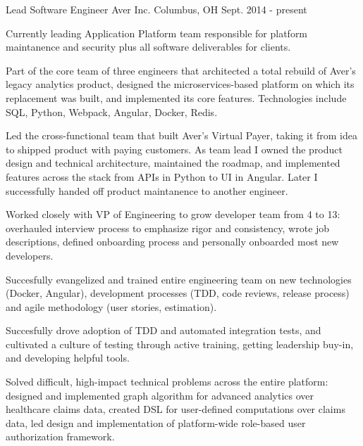 

\begin{cventries}

  \cventry
    {Lead Software Engineer} %
    {Aver Inc.} %
    {Columbus, OH} %
    {Sept. 2014 - present} %
    {
      \begin{cvitems} %
        \item {Currently leading Application Platform team responsible for platform maintanence and security plus all software deliverables for clients.}
        \item {Part of the core team of three engineers that architected a total rebuild of Aver's legacy analytics product, designed the microservices-based platform on which its replacement was built, and implemented its core features. Technologies include SQL, Python, Webpack, Angular, Docker, Redis.}
        \item {Led the cross-functional team that built Aver's Virtual Payer, taking it from idea to shipped product with paying customers. As team lead I owned the product design and technical architecture, maintained the roadmap, and implemented features across the stack from APIs in Python to UI in Angular. Later I successfully handed off product maintanence to another engineer.}
        \item {Worked closely with VP of Engineering to grow developer team from 4 to 13: overhauled interview process to emphasize rigor and consistency, wrote job descriptions, defined onboarding process and personally onboarded most new developers.}
        \item {Succesfully evangelized and trained entire engineering team on new technologies (Docker, Angular), development processes (TDD, code reviews, release process) and agile methodology (user stories, estimation). }
        \item {Succesfully drove adoption of TDD and automated integration tests, and cultivated a culture of testing through active training, getting leadership buy-in, and developing helpful tools. }
        \item {Solved difficult, high-impact technical problems across the entire platform: designed and implemented graph algorithm for advanced analytics over healthcare claims data, created DSL for user-defined computations over claims data, led design and implementation of platform-wide role-based user authorization framework.}
      \end{cvitems}
    }


\end{cventries}
